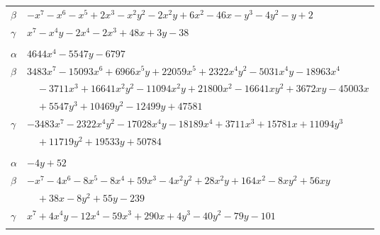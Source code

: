 \documentclass[11pt]{article}
\begin{document}
\begin{longtable}{@{}ll@{}}
$\beta$ & $-x^{7}-x^{6}-x^{5}+2x^{3}-x^{2}y^{2}-2x^{2}y+6x^{2}-46x-y^{3}-4y^{2}-y+2$\\
$\gamma$ & $x^{7}-x^{4}y-2x^{4}-2x^{3}+48x+3y-38$\\
\addlinespace[3pt]
\multicolumn{2}{@{}l}{$\{i,j\}=\{34,36\}$, $k_{ij}=2^{4}\cdot 5^{4}$}\\
$\alpha$ & $4644x^{4}-5547y-6797$\\
$\beta$ & $3483x^{7}-15093x^{6}+6966x^{5}y+22059x^{5}+2322x^{4}y^{2}-5031x^{4}y-18963x^{4}$\\
 & $\quad -3711x^{3}+16641x^{2}y^{2}-11094x^{2}y+21800x^{2}-16641xy^{2}+3672xy-45003x$\\
 & $\quad +5547y^{3}+10469y^{2}-12499y+47581$\\
$\gamma$ & $-3483x^{7}-2322x^{4}y^{2}-17028x^{4}y-18189x^{4}+3711x^{3}+15781x+11094y^{3}$\\
 & $\quad +11719y^{2}+19533y+50784$\\
\addlinespace[3pt]
\multicolumn{2}{@{}l}{$\{i,j\}=\{35,38\}$, $k_{ij}=2^{5}\cdot 3^{2}$}\\
$\alpha$ & $-4y+52$\\
$\beta$ & $-x^{7}-4x^{6}-8x^{5}-8x^{4}+59x^{3}-4x^{2}y^{2}+28x^{2}y+164x^{2}-8xy^{2}+56xy$\\
 & $\quad +38x-8y^{2}+55y-239$\\
$\gamma$ & $x^{7}+4x^{4}y-12x^{4}-59x^{3}+290x+4y^{3}-40y^{2}-79y-101$\\
\addlinespace[3pt]
\end{longtable}
\endgroup
\end{document}

